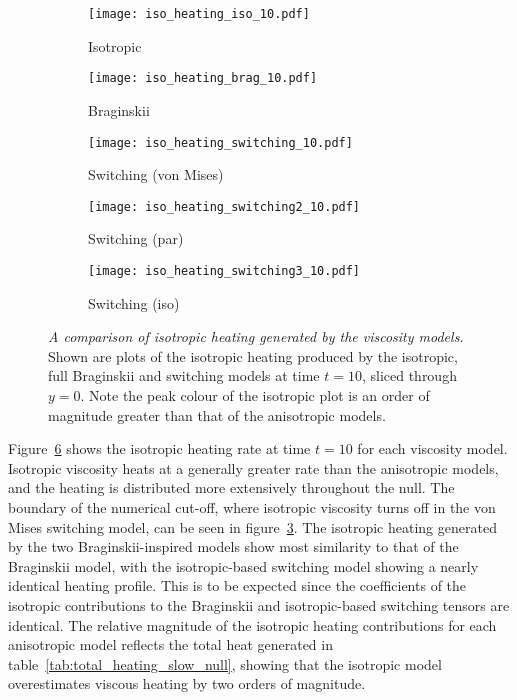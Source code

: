 \begin{figure}[t]
    \centering
    \hfill
    \begin{subfigure}{0.32\textwidth}
      \texttt{[image: iso\_heating\_iso\_10.pdf]}
      \caption{Isotropic}%
      \label{fig:iso_heating_iso_10}
    \end{subfigure}
    \hfill
    \begin{subfigure}{0.32\textwidth}
      \texttt{[image: iso\_heating\_brag\_10.pdf]}
      \caption{Braginskii}%
      \label{fig:iso_heating_brag_10}
    \end{subfigure}
    \hfill
    \begin{subfigure}{0.32\textwidth}
      \texttt{[image: iso\_heating\_switching\_10.pdf]}
      \caption{Switching (von Mises)}%
      \label{fig:iso_heating_switching_10}
    \end{subfigure}
    \begin{subfigure}{0.32\textwidth}
      \texttt{[image: iso\_heating\_switching2\_10.pdf]}
      \caption{Switching (par)}%
      \label{fig:iso_heating_switching2_10}
    \end{subfigure}
    \begin{subfigure}{0.32\textwidth}
      \texttt{[image: iso\_heating\_switching3\_10.pdf]}
      \caption{Switching (iso)}%
      \label{fig:iso_heating_switching3_10}
    \end{subfigure}

    \caption{\emph{A comparison of isotropic heating generated by the viscosity models.} Shown are plots of the isotropic heating produced by the isotropic, full Braginskii and switching models at time $t=10$, sliced through $y=0$. Note the peak colour of the isotropic plot is an order of magnitude greater than that of the anisotropic models.}
\label{fig:isotropic_heating}%
\end{figure}

Figure~\ref{fig:isotropic_heating} shows the isotropic heating rate at time $t=10$ for each viscosity model. Isotropic viscosity heats at a generally greater rate than the anisotropic models, and the heating is distributed more extensively throughout the null. The boundary of the numerical cut-off, where isotropic viscosity turns off in the von Mises switching model, can be seen in figure~\ref{fig:iso_heating_switching_10}. The isotropic heating generated by the two Braginskii-inspired models show most similarity to that of the Braginskii model, with the isotropic-based switching model showing a nearly identical heating profile. This is to be expected since the coefficients of the isotropic contributions to the Braginskii and isotropic-based switching tensors are identical. The relative magnitude of the isotropic heating contributions for each anisotropic model reflects the total heat generated in table~\ref{tab:total_heating_slow_null}, showing that the isotropic model overestimates viscous heating by two orders of magnitude.


